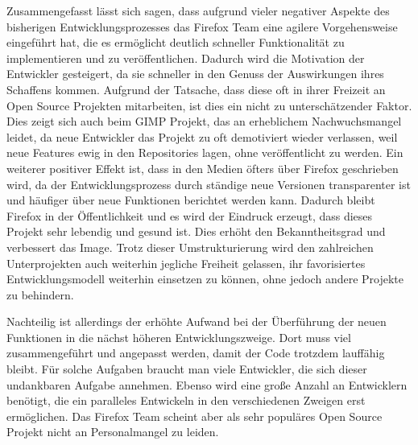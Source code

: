 Zusammengefasst lässt sich sagen, dass aufgrund vieler negativer Aspekte des bisherigen Entwicklungsprozesses das Firefox Team eine agilere Vorgehensweise eingeführt hat, die es ermöglicht deutlich schneller Funktionalität zu implementieren und zu veröffentlichen. Dadurch wird die Motivation der Entwickler gesteigert, da sie schneller in den Genuss der Auswirkungen ihres Schaffens kommen. Aufgrund der Tatsache, dass diese oft in ihrer Freizeit an Open Source Projekten mitarbeiten, ist dies ein nicht zu unterschätzender Faktor. Dies zeigt sich auch beim GIMP Projekt, das an erheblichem Nachwuchsmangel leidet, da neue Entwickler das Projekt zu oft demotiviert wieder verlassen, weil neue Features ewig in den Repositories lagen, ohne veröffentlicht zu werden. \cite{bib:gimp} Ein weiterer positiver Effekt ist, dass in den Medien öfters über Firefox geschrieben wird, da der Entwicklungsprozess durch ständige neue Versionen transparenter ist und häufiger über neue Funktionen berichtet werden kann. Dadurch bleibt Firefox in der Öffentlichkeit und es  wird der Eindruck erzeugt, dass dieses Projekt sehr lebendig und gesund ist. Dies erhöht den Bekanntheitsgrad und verbessert das Image. Trotz dieser Umstrukturierung wird den zahlreichen Unterprojekten auch weiterhin jegliche Freiheit gelassen, ihr favorisiertes Entwicklungsmodell weiterhin einsetzen zu können, ohne jedoch andere Projekte zu behindern.

Nachteilig ist allerdings der erhöhte Aufwand bei der Überführung der neuen Funktionen in die nächst höheren Entwicklungszweige. Dort muss viel zusammengeführt und angepasst werden, damit der Code trotzdem lauffähig bleibt. Für solche Aufgaben braucht man viele Entwickler, die sich dieser undankbaren Aufgabe annehmen. Ebenso wird eine große Anzahl an Entwicklern benötigt, die ein paralleles Entwickeln in den verschiedenen Zweigen erst ermöglichen. Das Firefox Team scheint aber als sehr populäres Open Source Projekt nicht an Personalmangel zu leiden.

